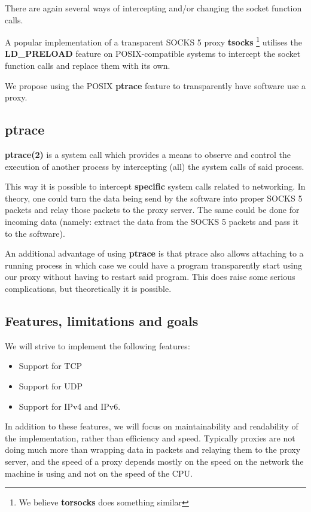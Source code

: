 \documentclass[a4paper]{article}
\begin{document}
There are again several ways of intercepting and/or changing the socket function
calls.

A popular implementation of a transparent SOCKS 5 proxy \textbf{tsocks}
\footnote{We believe \textbf{torsocks} does something similar}
utilises the \textbf{LD\_PRELOAD} feature on POSIX-compatible systems to
intercept the socket function calls and replace them with its own.

We propose using the POSIX \textbf{ptrace} feature to transparently have
software use a proxy.

\subsection{ptrace}

\textbf{ptrace(2)} is a system call which provides a means to observe and
control the execution of another process by intercepting (all) the system calls
of said process.

This way it is possible to intercept \textbf{specific} system calls related to
networking. In theory, one could turn the data being send by the software into
proper SOCKS 5 packets and relay those packets to the proxy server. The same
could be done for incoming data (namely: extract the data from the SOCKS 5
packets and pass it to the software).

An additional advantage of using \textbf{ptrace} is that ptrace also allows
attaching to a running process in which case we could have a program
transparently start using our proxy without having to restart said program. This
does raise some serious complications, but theoretically it is possible.

\subsection{Features, limitations and goals}

We will strive to implement the following features:

\begin{itemize}
\item Support for TCP
\item Support for UDP
\item Support for IPv4 and IPv6.
\end{itemize}

In addition to these features, we will focus on maintainability and readability
of the implementation, rather than efficiency and speed. Typically proxies are
not doing much more than wrapping data in packets and relaying them to the proxy
server, and the speed of a proxy depends mostly on the speed on the network the
machine is using and not on the speed of the CPU. \\
\end{document}
